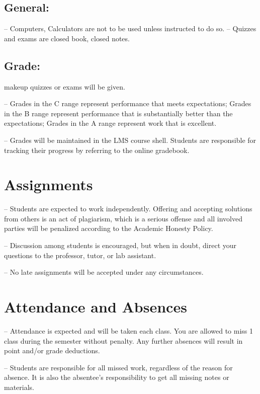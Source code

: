 \documentclass[]{article}
\begin{document}
\hypertarget{general}{%
\subsection{General:}\label{general}}

-- Computers, Calculators are not to be used unless instructed to do so.
-- Quizzes and exams are closed book, closed notes.

\hypertarget{grade}{%
\subsection{Grade:}\label{grade}}

makeup quizzes or exams will be given.

-- Grades in the C range represent performance that meets expectations;
Grades in the B range represent performance that is substantially better
than the expectations; Grades in the A range represent work that is
excellent.

-- Grades will be maintained in the LMS course shell. Students are
responsible for tracking their progress by referring to the online
gradebook.

\hypertarget{assignments}{%
\section{Assignments}\label{assignments}}

-- Students are expected to work independently. Offering and accepting
solutions from others is an act of plagiarism, which is a serious
offense and all involved parties will be penalized according to the
Academic Honesty Policy.

-- Discussion among students is encouraged, but when in doubt, direct
your questions to the professor, tutor, or lab assistant.

-- No late assignments will be accepted under any circumstances.

\hypertarget{attendance-and-absences}{%
\section{Attendance and Absences}\label{attendance-and-absences}}

-- Attendance is expected and will be taken each class. You are allowed
to miss 1 class during the semester without penalty. Any further
absences will result in point and/or grade deductions.

-- Students are responsible for all missed work, regardless of the
reason for absence. It is also the absentee's responsibility to get all
missing notes or materials.
\end{document}
